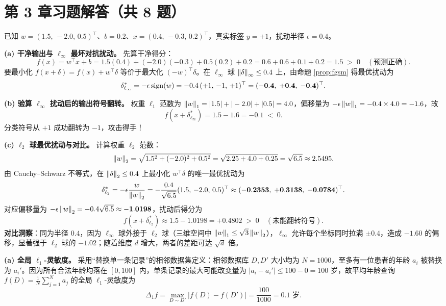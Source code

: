 \section*{第 3 章习题解答（共 8 题）}


已知 $w = (1.5,\, -2.0,\, 0.5)^\top$、$b = 0.2$、$x = (0.4,\, -0.3,\, 0.2)^\top$，真实标签 $y = +1$，扰动半径 $\epsilon = 0.4$。

\textbf{(a) 干净输出与 $\ell_\infty$ 最坏对抗扰动。}
先算干净得分：
\[
  f(x) = w^\top x + b
  = 1.5(0.4) + (-2.0)(-0.3) + 0.5(0.2) + 0.2
  = 0.6 + 0.6 + 0.1 + 0.2 = \mathbf{1.5} \;>\; 0 \quad (\text{预测正确}).
\]
要最小化 $f(x + \delta) = f(x) + w^\top \delta$ 等价于最大化 $(-w)^\top \delta$。在 $\ell_\infty$ 球 $\left\|\delta\right\|_\infty \le 0.4$ 上，由命题 \ref{prop:fgsm} 得最优扰动为
\[
  \delta^*_{\ell_\infty} = -\epsilon\operatorname{sign}(w) = -0.4\,(+1,\, -1,\, +1)^\top
  = \mathbf{(-0.4,\; +0.4,\; -0.4)^\top}.
\]

\textbf{(b) 验算 $\ell_\infty$ 扰动后的输出符号翻转。}
权重 $\ell_1$ 范数为 $\left\|w\right\|_1 = |1.5| + |-2.0| + |0.5| = 4.0$，偏移量为 $-\epsilon\left\|w\right\|_1 = -0.4 \times 4.0 = -1.6$，故
\[
  f(x + \delta^*_{\ell_\infty}) = 1.5 - 1.6 = \mathbf{-0.1} \;<\; 0.
\]
分类符号从 $+1$ 成功翻转为 $-1$，攻击得手！

\textbf{(c) $\ell_2$ 球最优扰动与对比。}
计算权重 $\ell_2$ 范数：
\[
  \left\|w\right\|_2 = \sqrt{1.5^2 + (-2.0)^2 + 0.5^2} = \sqrt{2.25 + 4.0 + 0.25} = \sqrt{6.5} \approx 2.5495.
\]
由 Cauchy--Schwarz 不等式，在 $\left\|\delta\right\|_2 \le 0.4$ 上最小化 $w^\top \delta$ 的唯一最优扰动为
\[
  \delta^*_{\ell_2} = -\epsilon\frac{w}{\left\|w\right\|_2}
  = -\frac{0.4}{\sqrt{6.5}}(1.5,\, -2.0,\, 0.5)^\top
  \approx \mathbf{(-0.2353,\; +0.3138,\; -0.0784)^\top}.
\]
对应偏移量为 $-\epsilon\left\|w\right\|_2 = -0.4\sqrt{6.5} \approx \mathbf{-1.0198}$，扰动后得分为
\[
  f(x + \delta^*_{\ell_2}) \approx 1.5 - 1.0198 = \mathbf{+0.4802} \;>\; 0 \quad (\text{未能翻转符号}).
\]
\textbf{对比洞察}：同为半径 $0.4$，因为 $\ell_\infty$ 球外接于 $\ell_2$ 球（三维空间中 $\left\|w\right\|_1 \le \sqrt{3}\left\|w\right\|_2$），$\ell_\infty$ 允许每个坐标同时拉满 $\pm 0.4$，造成 $-1.60$ 的偏移，显著强于 $\ell_2$ 球的 $-1.02$；随着维度 $d$ 增大，两者的差距可达 $\sqrt{d}$ 倍。


\textbf{(a) 全局 $\ell_1$-灵敏度。}
采用“替换单一条记录”的相邻数据集定义：相邻数据库 $D, D'$ 大小均为 $N = 1000$，至多有一位患者的年龄 $a_i$ 被替换为 $a_i'$。因为所有合法年龄均落在 $[0, 100]$ 内，单条记录的最大可能改变量为 $|a_i - a_i'| \le 100 - 0 = 100$ 岁，故平均年龄查询 $f(D) = \frac{1}{N}\sum_{j=1}^N a_j$ 的全局 $\ell_1$-灵敏度为
\[
  \Delta_1 f = \max_{D \sim D'} |f(D) - f(D')|
  = \frac{100}{1000} = \mathbf{0.1} \text{ 岁}.
\]

